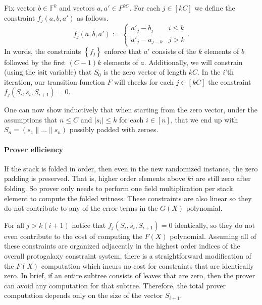 \documentclass[11pt]{article} %
\newcommand{\F}{\ensuremath{\mathbb F}\xspace}
\newcommand{\defeq}{:=}
\newcommand{\set}[1]{\ensuremath{\left\{#1\right\}}\xspace}
\newcommand{\init}{\ensuremath{\mathsf{init}}\xspace}
\begin{document}
Fix vector $b\in \F^k$ and vectors $a,a'\in F^{kC}$.
For each $j\in [kC]$ we define the constraint $f_j(a,b,a')$ as follows.
\begin{equation*} 
f_j(a, b, a') \defeq \begin{cases}
    a'_j - b_j & i \leq k \\
    a'_j - a_{j - k} & j > k
\end{cases}.
\end{equation*}
In words, the constraints \set{f_j} enforce that $a'$ consists of the $k$ elements of $b$ followed by the first $(C-1)k$ elements
of $a$.
Additionally, we will constrain (using the \init variable) that $S_0$ is the zero vector of length $kC$.
In the $i$'th iteration, our transition function $F$ will checks for each $j\in [kC]$ the constraint $f_j(S_i,s_i,S_{i+1})=0$.

One can now show inductively that when starting from the zero vector, under the assumptions that $n\leq C$ and $|s_i|\leq k$ for each $i\in [n]$, that we end up with $S_n=(s_1\|\ldots\| s_n)$ possibly padded with zeroes.

% 
% 
\paragraph{Prover efficiency}
If the stack is folded in order, then even in the new randomized instance, the zero padding is preserved.
That is, higher order elements above $ ki$ are still zero after folding.
So prover only needs to perform one field multiplication per stack element to compute the folded witness.
These constraints are also linear so they do not contribute to any of the error terms in the $G(X)$ polynomial.

For all $j > k (i+1)$ notice that $f_j(S_i, s_i, S_{i+1}) = 0$ identically, so they do not even contribute to the cost of computing the $F(X)$ polynomial.
Assuming all of these constraints are organized adjacently in the highest order indices of the overall protogalaxy constraint system, there is a straightforward modification of the $F(X)$ computation which incurs no cost for constraints that are identically zero.
In brief, if an entire subtree consists of leaves that are zero, then the prover can avoid any computation for that subtree.
Therefore, the total prover computation depends only on the size of the vector $S_{i+1}$.





\end{document}
